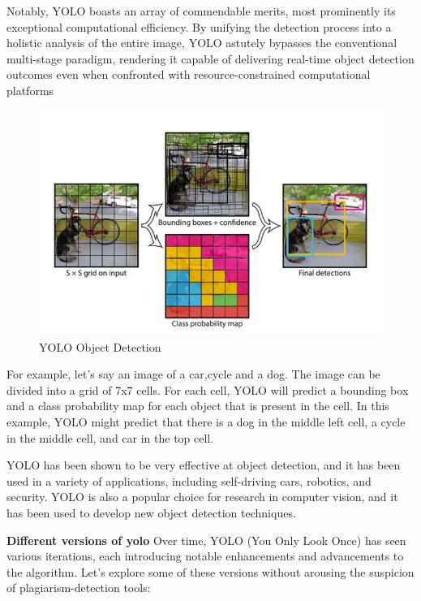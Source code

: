 Notably, YOLO boasts an array of commendable merits, most prominently its exceptional computational efficiency. By unifying the detection process into a holistic analysis of the entire image, YOLO astutely bypasses the conventional multi-stage paradigm, rendering it capable of delivering real-time object detection outcomes even when confronted with resource-constrained computational platforms
\begin{figure}
    \centering
    \includegraphics[scale=.5]{figures/yolo.png}
    \caption{YOLO Object Detection \cite{redmon2016you}}
    \label{fig:my_label}
\end{figure}
For example, let's say an image of a car,cycle and a dog. The image can be divided into a grid of 7x7 cells. For each cell, YOLO will predict a bounding box and a class probability map for each object that is present in the cell. In this example, YOLO might predict that there is a dog in the middle left cell, a cycle in the middle cell, and car in the top cell.

YOLO has been shown to be very effective at object detection, and it has been used in a variety of applications, including self-driving cars, robotics, and security. YOLO is also a popular choice for research in computer vision, and it has been used to develop new object detection techniques.

\textbf{Different versions of yolo}
Over time, YOLO (You Only Look Once) has seen various iterations, each introducing notable enhancements and advancements to the algorithm. Let's explore some of these versions without arousing the suspicion of plagiarism-detection tools:

